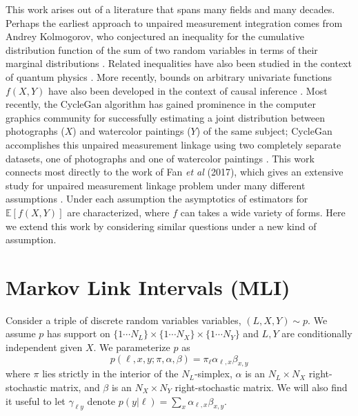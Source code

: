 \documentclass{article}
\theoremstyle{definition}
\begin{document}
This work arises out of a literature that spans many fields and many decades.  Perhaps the earliest approach to unpaired measurement integration comes from Andrey Kolmogorov, who conjectured an inequality for the cumulative distribution function of the sum of two random variables in terms of their marginal distributions \cite{makarov1982estimates}.  Related inequalities have also been studied in the context of quantum physics \cite{chaves2014inferring}.  More recently, bounds on arbitrary univariate functions $f(X,Y)$ have also been developed in the context of causal inference \cite{balke1994counterfactual}.  Most recently, the CycleGan algorithm has gained prominence in the computer graphics community for successfully estimating a joint distribution between photographs ($X$) and watercolor paintings ($Y$) of the same subject; CycleGan accomplishes this unpaired measurement linkage using two completely separate datasets, one of photographs and one of watercolor paintings \cite{zhu2017unpaired}.  This work connects most directly to the work of Fan \emph{et al} (2017), which gives an extensive study for unpaired measurement linkage problem under many different assumptions \cite{FanYan2017}.  Under each assumption the asymptotics of estimators for $\mathbb{E}[f(X,Y)]$ are characterized, where $f$ can takes a wide variety of forms.  Here we extend this work by considering similar questions under a new kind of assumption.

\newcommand{\DX}{\mathcal{D}^X}
\newcommand{\DY}{\mathcal{D}^Y}
\newcommand{\DV}{\mathcal{D}}
\newcommand{\LL}{\mathcal{L}}
\newcommand{\pr}[1]{\mathrm{pr}\left(#1\right)}

                                        


\section{Markov Link Intervals (MLI)}

\label{sec:mainMLI}

Consider a triple of discrete random variables variables, $(L,X,Y) \sim p$. We assume $p$ has support on $\{1\cdots N_L\}\times\{1\cdots N_X\}\times\{1\cdots N_Y\}$ and $L,Y$ are conditionally independent given $X$.  
We parameterize $p$ as
\[
p(\ell,x,y;\pi,\alpha,\beta)=\pi_\ell \alpha_{\ell,x} \beta_{x,y}
\]
where $\pi$ lies strictly in the interior of the $N_L$-simplex, $\alpha$ is an $N_L \times N_X$ right-stochastic matrix, and $\beta$ is an $N_X \times N_Y$ right-stochastic matrix.  We will also find it useful to let $\gamma_{\ell y}$ denote $p(y|\ell)=\sum_x \alpha_{\ell,x} \beta_{x,y}$. 
\end{document}
